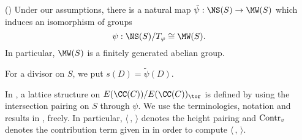 \begin{thm}\label{thm:shioda-basic}{(\cite[Theorem~1.3]{shioda90}) Under our assumptions,
there is a natural map $\tilde{\psi} : \NS(S) \to \MW(S)$ which induces an isomorphism of 
groups
\[
\psi : \NS(S)/T_{\varphi} \cong \MW(S).
\]
In particular, $\MW(S)$ is a finitely generated abelian group.
}
\end{thm}

For a divisor on $S$, we  put $s(D) = \tilde\psi(D)$. 

In \cite{shioda90}, a lattice structure on $E(\CC(C))/E(\CC(C))_{\tor}$ is defined by using
the intersection pairing on $S$ through $\psi$. We use the terminologies, notation and results in \cite{shioda90}, freely.
In particular, $\langle \, , \, \rangle$ denotes the height pairing and $\mbox{\rm Contr}_v$ denotes the contribution term
given in \cite{shioda90} in order to compute $\langle \, , \, \rangle$.


%
%
%
%
%

